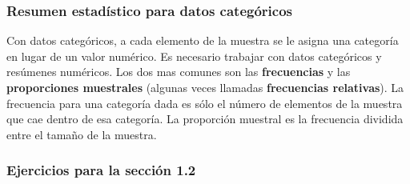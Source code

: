 \documentclass[10pt,a4paper]{book}
\begin{document}
\subsubsection{Resumen estadístico para datos categóricos}

Con datos categóricos, a cada elemento de la muestra se le asigna una categoría en lugar de un valor numérico. Es necesario trabajar con datos categóricos y resúmenes numéricos. Los dos mas comunes son las \textbf{frecuencias} y las \textbf{proporciones muestrales} (algunas veces llamadas \textbf{frecuencias relativas}). La frecuencia para una categoría dada es sólo el número de elementos de la muestra que cae dentro de esa categoría. La proporción muestral es la frecuencia dividida entre el tamaño de la muestra.


\subsubsection{Ejercicios para la sección 1.2}
\end{document}
